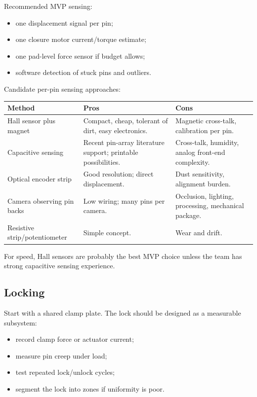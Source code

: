 \documentclass[11pt]{article}
\begin{document}
Recommended MVP sensing:

\begin{itemize}[leftmargin=*]
  \item one displacement signal per pin;
  \item one closure motor current/torque estimate;
  \item one pad-level force sensor if budget allows;
  \item software detection of stuck pins and outliers.
\end{itemize}

Candidate per-pin sensing approaches:

\begin{longtable}{L{0.22\textwidth} L{0.31\textwidth} L{0.35\textwidth}}
\toprule
\textbf{Method} & \textbf{Pros} & \textbf{Cons} \\
\midrule
\endhead
Hall sensor plus magnet & Compact, cheap, tolerant of dirt, easy electronics. & Magnetic cross-talk, calibration per pin. \\
Capacitive sensing & Recent pin-array literature support; printable possibilities. & Cross-talk, humidity, analog front-end complexity. \\
Optical encoder strip & Good resolution; direct displacement. & Dust sensitivity, alignment burden. \\
Camera observing pin backs & Low wiring; many pins per camera. & Occlusion, lighting, processing, mechanical package. \\
Resistive strip/potentiometer & Simple concept. & Wear and drift. \\
\bottomrule
\end{longtable}

For speed, Hall sensors are probably the best MVP choice unless the team has strong capacitive sensing experience.

\subsection{Locking}

Start with a shared clamp plate. The lock should be designed as a measurable subsystem:

\begin{itemize}[leftmargin=*]
  \item record clamp force or actuator current;
  \item measure pin creep under load;
  \item test repeated lock/unlock cycles;
  \item segment the lock into zones if uniformity is poor.
\end{itemize}
\end{document}
